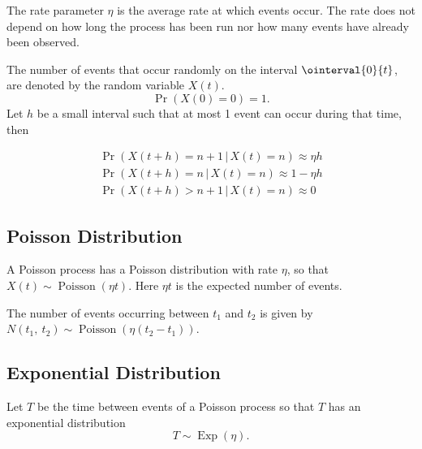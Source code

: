 \documentclass{article}
\begin{document}
\begin{multicols}{3}
    The rate parameter \(\eta\) is the average rate at which events
    occur. The rate does not depend on how long the process has been
    run nor how many events have already been observed.

    The number of events that occur randomly on the interval
    \(\ointerval{0}{t}\), are denoted by the random variable \(X\left(
    t \right)\).
    \begin{equation*}
        \Pr{\left( X\left( 0 \right) = 0 \right)} = 1.
    \end{equation*}
    Let \(h\) be a small interval such that at most 1 event can occur during that time, then

    \begin{gather*}
        \Pr{\left( X\left( t + h \right) = n + 1 \,\vert\, X\left( t \right) = n \right)} \approx \eta h     \\
        \Pr{\left( X\left( t + h \right) = n \,\vert\, X\left( t \right) = n \right)}     \approx 1 - \eta h \\
        \Pr{\left( X\left( t + h \right) > n + 1 \,\vert\, X\left( t \right) = n \right)} \approx 0
    \end{gather*}
    \subsection{Poisson Distribution}
    A Poisson process has a Poisson distribution with rate \(\eta\), so
    that \(X\left( t \right) \sim \operatorname{Poisson}{\left( \eta t
    \right)}\). Here \(\eta t\) is the expected number of events.

    The number of events occurring between \(t_1\) and \(t_2\) is given
    by \(N\left( t_1,\: t_2 \right) \sim \operatorname{Poisson}{\left(
    \eta \left( t_2 - t_1 \right) \right)}\).
    \subsection{Exponential Distribution}
    Let \(T\) be the time between events of a Poisson process so that
    \(T\) has an exponential distribution
    \begin{equation*}
        T \sim \operatorname{Exp}{\left( \eta \right)}.
    \end{equation*}

\end{multicols}
\end{document}
